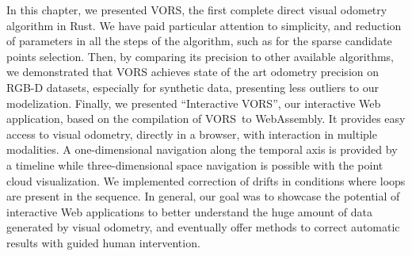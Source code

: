 In this chapter, we presented VORS,
the first complete direct visual odometry algorithm in Rust.
We have paid particular attention to simplicity,
and reduction of parameters in all the steps of the algorithm,
such as for the sparse candidate points selection.
Then, by comparing its precision to other available algorithms,
we demonstrated that VORS achieves state of the art odometry precision on RGB-D datasets,
especially for synthetic data, presenting less outliers to our modelization.
Finally, we presented ``Interactive VORS'',
our interactive Web application, based on the compilation of VORS to WebAssembly.
It provides easy access to visual odometry, directly in a browser,
with interaction in multiple modalities.
A one-dimensional navigation along the temporal axis is provided by a timeline
while three-dimensional space navigation is possible with the point cloud visualization.
We implemented correction of drifts in conditions where loops are present in the sequence.
In general, our goal was to showcase the potential of interactive Web applications
to better understand the huge amount of data generated by visual odometry,
and eventually offer methods to correct automatic results with guided human intervention.
